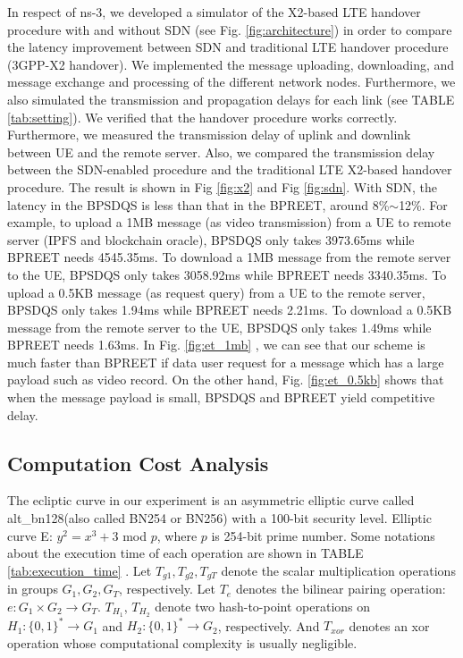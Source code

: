 \documentclass[journal,10pt]{IEEEtran}
\begin{document}
In respect of ns-3, we developed a simulator of the X2-based LTE handover procedure with and without SDN (see Fig. \ref{fig:architecture}) in order to compare the latency improvement between SDN and traditional LTE handover procedure (3GPP-X2 handover). We implemented the message uploading, downloading, and message exchange and processing of the different network nodes. Furthermore, we also simulated the transmission and propagation delays for each link (see TABLE \ref{tab:setting}). We verified that the handover procedure works correctly. Furthermore, we measured the transmission delay of uplink and downlink between UE and the remote server. Also, we compared the transmission delay between the SDN-enabled procedure and the traditional LTE X2-based handover procedure. The result is shown in Fig \ref{fig:x2} and Fig \ref{fig:sdn}. With SDN, the latency in the BPSDQS is less than that in the BPREET, around 8\%$\sim$12\%. For example, to upload a 1MB message (as video transmission) from a UE to remote server (IPFS and blockchain oracle), BPSDQS only takes 3973.65ms while BPREET needs 4545.35ms. To download a 1MB message from the remote server to the UE, BPSDQS only takes 3058.92ms while BPREET needs 3340.35ms. To upload a 0.5KB message (as request query) from a UE to the remote server, BPSDQS only takes 1.94ms while BPREET needs 2.21ms. To download a 0.5KB message from the remote server to the UE, BPSDQS only takes 1.49ms while BPREET needs 1.63ms. In Fig. \ref{fig:et_1mb} , we can see that our scheme is much faster than BPREET if data user request for a message which has a large payload such as video record. On the other hand, Fig. \ref{fig:et_0.5kb} shows that when the message payload is small, BPSDQS and BPREET yield competitive delay.


\subsection{Computation Cost Analysis}
  The ecliptic curve in our experiment is an asymmetric elliptic curve called alt\_bn128(also called BN254 or BN256) with a 100-bit security level. Elliptic curve E: $y^2 = x^3 + 3$ mod $p$, where $p$ is 254-bit prime number. Some notations about the execution time of each operation are shown in TABLE \ref{tab:execution_time} \cite{BPREET}. Let $T_{g1}, T_{g2}, T_{gT}$ denote the scalar multiplication operations in groups $G_1, G_2, G_T$, respectively. Let $T_e$ denotes the bilinear pairing operation: ${e:G_1\times G_2 \to G_T}$. $T_{H_1}$, $T_{H_2}$ denote two hash-to-point operations on $H_1: \{0,1\}^{*} \to G_1$ and $H_2: \{0,1\}^{*} \to G_2$, respectively. And $T_{xor}$ denotes an xor operation whose computational complexity is usually negligible. 
  
\end{document}
